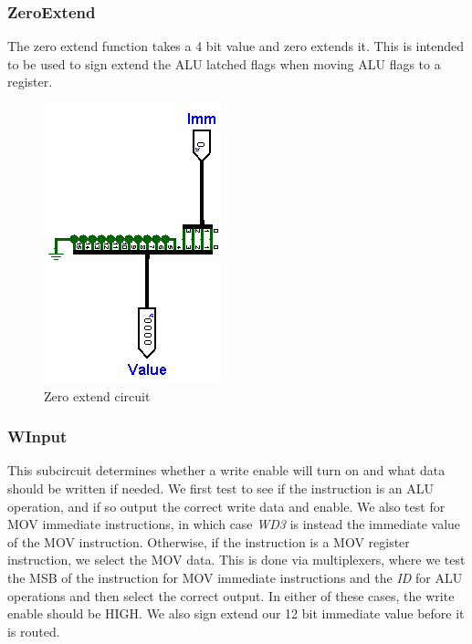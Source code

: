 \documentclass[12pt, letter]{article}
\begin{document}
	\subsubsection{ZeroExtend}
	The zero extend function takes a 4 bit value and zero extends it. This is intended to be used to sign extend the ALU latched flags when moving ALU flags to a register.
	
	\begin{figure}[h]
		\centering
		\includegraphics[scale = 0.35]{ZeroExtend}
		\caption{Zero extend circuit}
		\label{fig:ZeroExtend}
	\end{figure}
	
	\subsubsection{WInput}
	This subcircuit determines whether a write enable will turn on and what data should be written if needed. We first test to see if the instruction  is an ALU operation, and if so output the correct write data and enable. We also test for MOV immediate instructions, in which case \textit{WD3} is instead the immediate value of the MOV instruction. Otherwise, if the instruction is a MOV register instruction, we select the MOV data. This is done via multiplexers, where we test the MSB of the instruction for MOV immediate instructions and the \textit{ID} for ALU operations and then select the correct output. In either of these cases, the write enable should be HIGH. We also sign extend our 12 bit immediate value before it is routed. 
	
\end{document}
